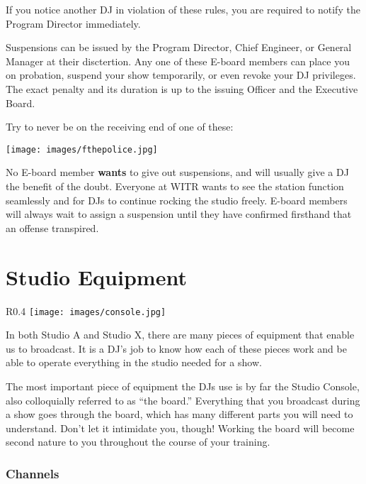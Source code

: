 \documentclass{witrman}
\begin{document}
If you notice another DJ in violation of these rules, you are required to notify
the Program Director immediately.

Suspensions can be issued by the Program Director, Chief Engineer, or General Manager 
at their disctertion.  Any one of these E-board members can place you on probation,
suspend your show temporarily, or even revoke your DJ privileges.  The exact penalty
and its duration is up to the issuing Officer and the Executive Board.

Try to never be on the receiving end of one of these:

\begin{center}
    \texttt{[image: images/fthepolice.jpg]}
\end{center}

No E-board member \textbf{wants} to give out suspensions, and will usually
give a DJ the benefit of the doubt.  Everyone at WITR wants to see the station
function seamlessly and for DJs to continue rocking the studio freely.
E-board members will always wait to assign a suspension until they have
confirmed firsthand that an offense transpired.


\chapter{Studio Equipment}

\begin{wrapfigure}{R}{0.4\linewidth}
    \centering
    \texttt{[image: images/console.jpg]}
\end{wrapfigure}

In both Studio A and Studio X, there are many pieces of equipment that enable us to
broadcast.  It is a DJ's job to know how each of these pieces work and be able to
operate everything in the studio needed for a show.

The most important piece of equipment the DJs use is by far the Studio Console,
also colloquially referred to as ``the board.''  Everything that you 
broadcast during a show goes through the board, which has many different
parts you will need to understand.  Don't let it intimidate you, though!
Working the board will become second nature to you throughout the course of your
training.

\subsection{Channels}
\end{document}
